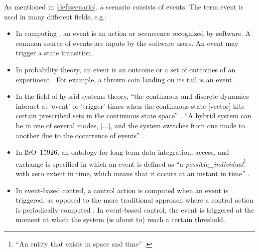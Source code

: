 As mentioned in \cref{def:scenario}, a scenario consists of events. 
The term event is used in many different fields, e.g.:
\begin{itemize}
	\item In computing \autocite{breu1997towards}, an event is an action or occurrence recognized by software. A common source of events are inputs by the software users. An event may trigger a state transition.
	
	\item In probability theory, an event is an outcome or a set of outcomes of an experiment \autocite{pfeiffer2013concepts}. For example, a thrown coin landing on its tail is an event.
	
	
	\item In the field of hybrid systems theory, ``the continuous and discrete dynamics interact at `event' or `trigger' times when the continuous state [vector] hits certain prescribed sets in the continuous state space'' \autocite{branicky1998hybridcontrol}. ``A hybrid system can be in one of several modes, [...], and the system switches from one mode to another due to the occurrence of events'' \autocite{deschutter2000optimal}.
	
	\cstartb\item In ISO~15926, an ontology for long-term data integration, access, and exchange is specified in which an event is defined as ``a \emph{possible\_individual}\footnote{\cstartb ``An entity that exists in space and time'' \autocite{batres2007upper}.\cendb} with zero extent in time, which means that it occurs at an instant in time'' \autocite{batres2007upper}. \cendb
	
	\item In event-based control, a control action is computed when an event is triggered, as opposed to the more traditional approach where a control action is periodically computed \autocite{heemels2012eventcontrol}. In event-based control, the event is triggered at the moment at which the system (is about to) reach a certain threshold.
\end{itemize}

